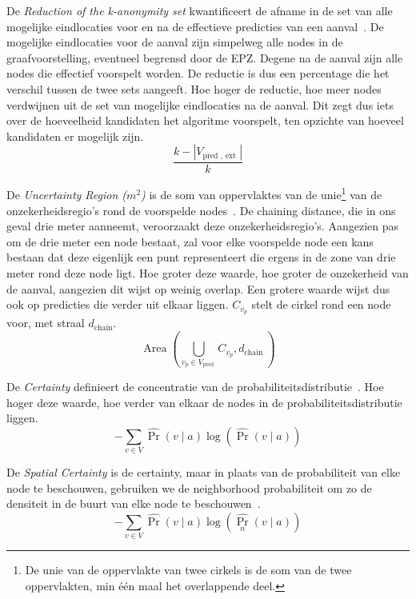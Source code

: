 De \textit{Reduction of the k-anonymity set} kwantificeert de afname in de set
van alle mogelijke eindlocaties voor en na de effectieve predicties van een
aanval~\cite{Dhondt, Verdonck_2022}. De mogelijke eindlocaties voor de aanval
zijn simpelweg alle nodes in de graafvoorstelling, eventueel begrensd door de
\ac{EPZ}. Degene na de aanval zijn alle nodes die effectief voorspelt worden.
De reductie is dus een percentage die het verschil tussen de twee sets
aangeeft. Hoe hoger de reductie, hoe meer nodes verdwijnen uit de set van
mogelijke eindlocaties na de aanval. Dit zegt dus iets over de hoeveelheid
kandidaten het algoritme voorspelt, ten opzichte van hoeveel kandidaten er
mogelijk zijn.
\begin{equation}
    \frac{k-\left|V_{\text {pred }, \text { ext }}\right|}{k}\label{eq:reduction}
\end{equation}

De \textit{Uncertainty Region ($m^2$)} is de som van oppervlaktes van de
unie\footnote{De unie van de oppervlakte van twee cirkels is de som van de twee
    oppervlakten, min één maal het overlappende deel.} van de onzekerheidsregio's
rond de voorspelde nodes~\cite{Dhondt,Verdonck_2022}. De chaining distance, die
in ons geval drie meter aanneemt, veroorzaakt deze onzekerheidsregio's.
Aangezien pas om de drie meter een node bestaat, zal voor elke voorspelde node
een kans bestaan dat deze eigenlijk een punt representeert die ergens in de
zone van drie meter rond deze node ligt. Hoe groter deze waarde, hoe groter de
onzekerheid van de aanval, aangezien dit wijst op weinig overlap. Een grotere
waarde wijst dus ook op predicties die verder uit elkaar liggen. $C_{v_p}$
stelt de cirkel rond een node voor, met straal $d_{\text{chain}}$.
\begin{equation}
    \operatorname{Area}\left(\bigcup_{v_p \in V_{\text {pred }}} C_{v_p}, d_{\text {chain }}\right)\label{eq:uncertainty}
\end{equation}

De \textit{Certainty} definieert de concentratie van de
probabiliteitsdistributie~\cite{Dhondt}. Hoe hoger deze waarde, hoe verder van
elkaar de nodes in de probabiliteitsdistributie liggen.
\begin{equation}
    -\sum_{v \in V} \widehat{\operatorname{Pr}}(v \mid a) \log (\widehat{\operatorname{Pr}}(v \mid a))\label{eq:certainty}
\end{equation}

De \textit{Spatial Certainty} is de certainty, maar in plaats van de
probabiliteit van elke node te beschouwen, gebruiken we de neighborhood
probabiliteit om zo de densiteit in de buurt van elke node te
beschouwen~\cite{Dhondt}.
\begin{equation}
    -\sum_{v \in V} \widehat{\operatorname{Pr}}(v \mid a) \log \left(\widehat{\operatorname{Pr}_n}(v \mid a)\right)\label{eq:spatial_certainty}
\end{equation}

